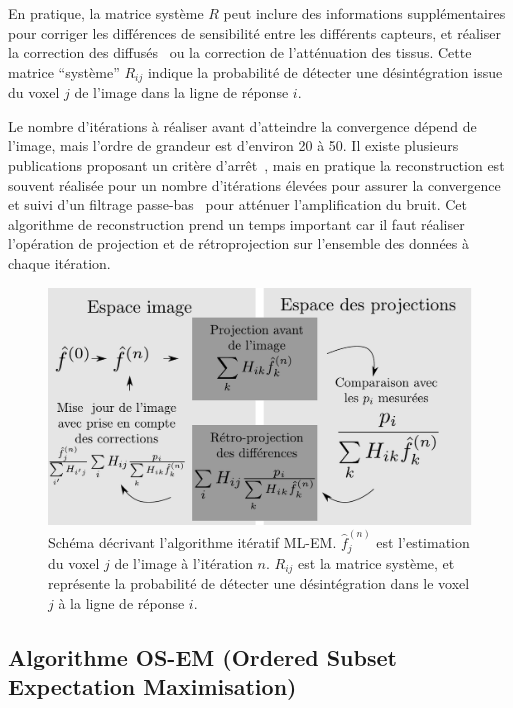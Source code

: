 En pratique, la matrice système $R$ peut inclure des informations supplémentaires pour corriger les différences de sensibilité entre les différents capteurs, et réaliser la correction des diffusés~\cite{shepp1982maximum,chornoboy1990evaluation} ou la correction de l'atténuation des tissus. Cette matrice ``système'' $R_{ij}$ indique la probabilité de détecter une désintégration issue du voxel $j$ de l'image dans la ligne de réponse $i$.




Le nombre d'itérations à réaliser avant d'atteindre la convergence dépend de l'image, mais l'ordre de grandeur est d'environ 20 à 50. Il existe plusieurs publications proposant un critère d'arrêt~\cite{bissantz2006multi}, mais en pratique la reconstruction est souvent réalisée pour un nombre d'itérations élevées pour assurer la convergence~\cite{bailey2005positon} et  suivi d'un filtrage passe-bas~\cite{daube2001application} pour atténuer l'amplification du bruit. Cet algorithme de reconstruction prend un temps important car il faut réaliser l'opération de projection et de rétroprojection sur l'ensemble des données à chaque itération.

\begin{figure}
\centering
\includegraphics[width=12cm]{images/MLEM}
\caption[Schéma de principe de l'algorithme MLEM]{Schéma décrivant l'algorithme itératif ML-EM. $\hat{f}^{(n)}_j$ est l'estimation du voxel $j$ de l'image à l'itération $n$. $R_{ij}$ est la matrice système, et représente la probabilité de détecter une désintégration dans le voxel $j$ à la ligne de réponse $i$.}
\label{fig:schemaMLEM}
\end{figure}


	\subsection{Algorithme OS-EM (Ordered Subset Expectation Maximisation)}

